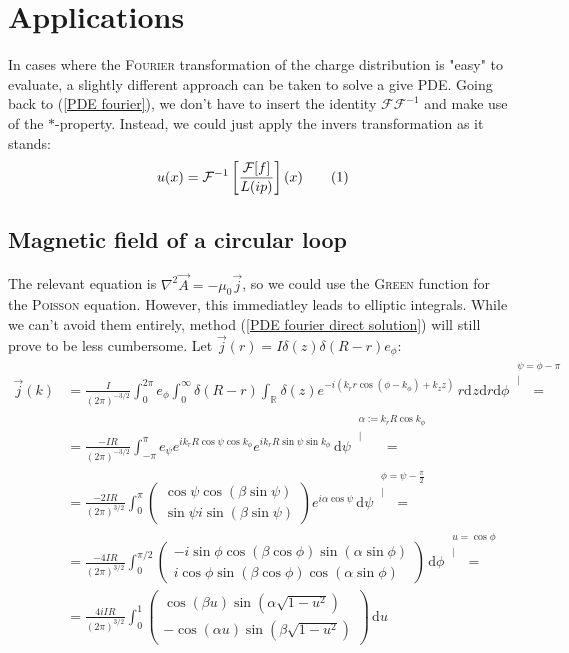 \documentclass[a4paper,12pt]{article}
\newcommand\numberthis{\addtocounter{equation}{1}\tag{\theequation}}
\newcommand{\kom}{}
\newcommand{\intx}{}
\newcommand{\intr}{}
\newcommand{\klam}{}
\begin{document}
\section{Applications}
In cases where the \textsc{Fourier} transformation of the charge distribution is "easy" to evaluate, a slightly different approach can be taken to solve a give PDE. Going back to (\ref{PDE fourier}), we don't have to insert the identity $\mathcal{F}\mathcal{F}^{-1}$ and make use of the $\ast$-property. Instead, we could just apply the invers transformation as it stands:
\begin{align*}
u(x)&=\mathcal{F}^{-1}\klam\left[ {\frac{\mathcal{F}[f]}{L(ip)}} \right](x)\numberthis\label{PDE fourier direct solution}
\end{align*}
\subsection{Magnetic field of a circular loop}
The relevant equation is $\nabla^2\vec{A}=-\mu_0\vec{j}$, so we could use the \textsc{Green} function for the \textsc{Poisson} equation. However, this immediatley leads to elliptic integrals. While we can't avoid them entirely, method (\ref{PDE fourier direct solution}) will still prove to be less cumbersome. Let $\vec{j}(r)=I\delta(z)\delta(R-r)e_\phi$:
\begin{align*}
\vec{j}(k)&=\frac{I}{(2\pi)^{-3/2}}\intx\int_{0}^{2\pi}e_\phi \intx\int_{0}^{\infty}\delta(R-r)\intr\int_{\mathbb{R}^{ }}{\delta(z)}e^{-i(k_rr\cos(\phi -k_\phi) +k_zz)}\,r\mathrm{d}^{ }z\mathrm{d}r\mathrm{d}\phi\kom\overset{\substack{{\psi=\phi-\pi} \\ |}}{=}\\
&=\frac{-IR}{(2\pi)^{-3/2}}\intx\int_{-\pi}^{\pi}e_\psi e^{ik_rR\cos\psi\cos k_\phi}e^{ik_rR\sin\psi\sin k_\phi}\,\mathrm{d}\psi\kom\overset{\substack{{\alpha:=k_rR\cos k_\phi} \\ |}}{=}\\
&=\frac{-2IR}{(2\pi)^{3/2}}\intx\int_{0}^{\pi}\begin{pmatrix}
\cos\psi\cos(\beta\sin\psi) \\ \sin\psi i\sin(\beta\sin\psi)
\end{pmatrix}e^{i\alpha\cos\psi} \,\mathrm{d}\psi\kom\overset{\substack{{\phi=\psi-\frac{\pi}{2}} \\ |}}{=}\\
&=\frac{-4IR}{(2\pi)^{3/2}}\intx\int_{0}^{\pi/2}\begin{pmatrix}
-i\sin\phi\cos(\beta\cos\phi)\sin(\alpha\sin\phi) \\ i\cos\phi\sin(\beta\cos\phi)\cos(\alpha\sin\phi)
\end{pmatrix} \,\mathrm{d}\phi\kom\overset{\substack{{u=\cos\phi} \\ |}}{=}\\
&=\frac{4iIR}{(2\pi)^{3/2}}\intx\int_{0}^{1}\begin{pmatrix}
\cos(\beta u)\sin(\alpha\sqrt{1-u^2}) \\ -\cos(\alpha u)\sin(\beta\sqrt{1-u^2})
\end{pmatrix} \,\mathrm{d}u
\end{align*}
\end{document}
